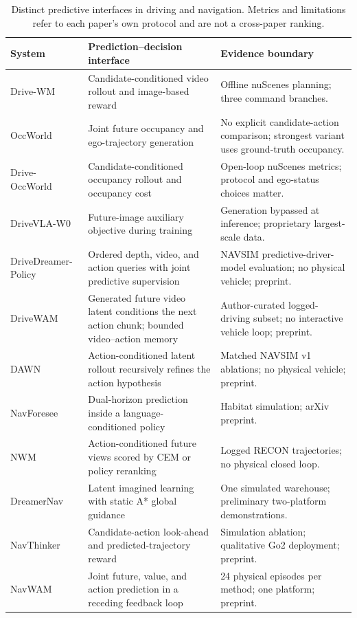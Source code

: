 \begin{table}[t]
\caption{Distinct predictive interfaces in driving and navigation. Metrics and limitations refer to each paper's own protocol and are not a cross-paper ranking.}
\label{tab:driving-navigation}
\small
\begin{tabularx}{\linewidth}{@{}>{\raggedright\arraybackslash}p{.18\linewidth}YY@{}}
\toprule
System & Prediction--decision interface & Evidence boundary \\
\midrule
Drive-WM~\cite{wang2024drivewm} & Candidate-conditioned video rollout and image-based reward & Offline nuScenes planning; three command branches. \\
\addlinespace
OccWorld~\cite{zheng2024occworld} & Joint future occupancy and ego-trajectory generation & No explicit candidate-action comparison; strongest variant uses ground-truth occupancy. \\
\addlinespace
Drive-OccWorld~\cite{yang2025driveoccworld} & Candidate-conditioned occupancy rollout and occupancy cost & Open-loop nuScenes metrics; protocol and ego-status choices matter. \\
\addlinespace
DriveVLA-W0~\cite{li2026drivevlaw0} & Future-image auxiliary objective during training & Generation bypassed at inference; proprietary largest-scale data. \\
\addlinespace
DriveDreamer-Policy~\cite{zhou2026drivedreamerpolicy} & Ordered depth, video, and action queries with joint predictive supervision & NAVSIM predictive-driver-model evaluation; no physical vehicle; preprint. \\
\addlinespace
DriveWAM~\cite{shi2026drivewam} & Generated future video latent conditions the next action chunk; bounded video--action memory & Author-curated logged-driving subset; no interactive vehicle loop; preprint. \\
\addlinespace
DAWN~\cite{lu2026dawn} & Action-conditioned latent rollout recursively refines the action hypothesis & Matched NAVSIM v1 ablations; no physical vehicle; preprint. \\
\addlinespace
NavForesee~\cite{liu2026navforesee} & Dual-horizon prediction inside a language-conditioned policy & Habitat simulation; arXiv preprint. \\
\addlinespace
NWM~\cite{bar2025nwm} & Action-conditioned future views scored by CEM or policy reranking & Logged RECON trajectories; no physical closed loop. \\
\addlinespace
DreamerNav~\cite{shanks2025dreamernav} & Latent imagined learning with static A* global guidance & One simulated warehouse; preliminary two-platform demonstrations. \\
\addlinespace
NavThinker~\cite{hu2026navthinker} & Candidate-action look-ahead and predicted-trajectory reward & Simulation ablation; qualitative Go2 deployment; preprint. \\
\addlinespace
NavWAM~\cite{azuma2026navwam} & Joint future, value, and action prediction in a receding feedback loop & 24 physical episodes per method; one platform; preprint. \\
\bottomrule
\end{tabularx}
\end{table}

